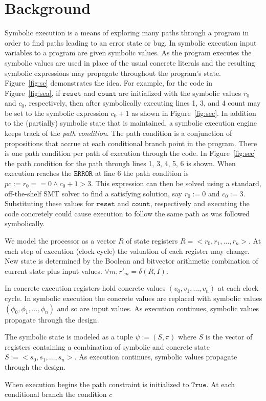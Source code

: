 \section{Background}
Symbolic execution is a means of exploring many paths through a program
in order to find paths leading to an error state or bug. In symbolic execution
input variables to a program are given symbolic values. As the program executes
the symbolic values are used in place of the usual concrete literals and the
resulting symbolic expressions may propagate throughout the program's
state. Figure~\ref{fig:se} demonstrates the idea. For example, for the code in
Figure~\ref{fig:sea}, if $\mathtt{reset}$ and $\mathtt{count}$ are initialized
with the symbolic values $r_0$ and $c_0$, respectively, then after symbolically
executing lines 1, 3, and 4 count may be set to the symbolic expression $c_0 +
1$ as shown in Figure~\ref{fig:sec}. In addition to the (partially) symbolic
state that is maintained, a symbolic execution engine keeps track of the
\emph{path condition}. The path condition is a conjunction of propositions that
accrue at each conditional branch point in the program. There is one path
condition per path of execution through the code. In Figure~\ref{fig:sec} the
path condition for the path through lines 1, 3, 4, 5, 6 is shown. When execution
reaches the $\mathtt{ERROR}$ at line 6 the path condition is $\mathit{pc} := r_0
== 0 \wedge c_0 + 1 > 3$. This expression can then be solved using a standard,
off-the-shelf SMT solver to find a satisfying solution, say $r_0 := 0$ and $c_0
:= 3$. Substituting these values for $\mathtt{reset}$ and $\mathtt{count}$,
respectively and executing the code concretely could cause execution to follow
the same path as was followed symbolically.

We model the processor as a vector $R$ of state registers $R = <r_0, r_1,
\ldots, r_n>$. At each step of execution (clock cycle) the valuation of each
register may change. New state is determined by the Boolean and bitvector
arithmetic combination of current state plus input values. $\forall m, r'_m =
\delta(R,I)$.

In concrete execution registers hold concrete values $(v_0, v_1, \ldots, v_n)$
at each clock cycle. In symbolic execution the concrete values are replaced with
symbolic values $(\phi_0, \phi_1, \ldots, \phi_n)$ and so are input values.
As execution continues, symbolic values propagate through the design.

The symbolic state is modeled as a tuple $\psi := (S,\pi)$ where $S$ is the
vector of registers containing a combination of symbolic and concrete state $S
:= <s_0, s_1, \ldots, s_n>$. As execution continues, symbolic values propagate
through the design.

When execution begins the path constraint is initialized to $\mathtt{True}$. At
each conditional branch the condition $c$


